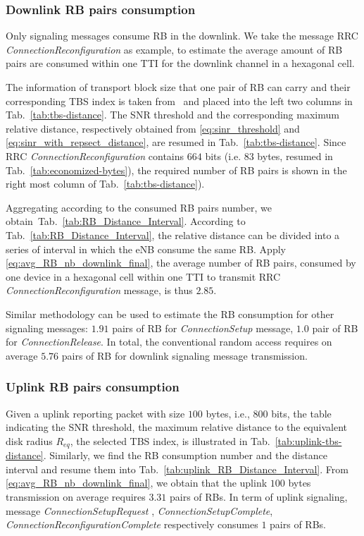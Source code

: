 
\subsubsection{Downlink RB pairs consumption}
Only signaling messages consume RB in the downlink. We take the message RRC \emph{ConnectionReconfiguration} as example, to estimate the average amount of RB pairs are consumed within one TTI for the downlink channel in a hexagonal cell. 

The information of transport block size that one pair of RB can carry and their corresponding TBS index is taken from~\cite[Tab.~7.1.7.2.1-1]{lte-eutra-physical-layer} and placed into the left two columns in Tab.~\ref{tab:tbs-distance}. The SNR threshold and the corresponding maximum relative distance, respectively obtained from \eqref{eq:sinr_threshold} and \eqref{eq:sinr_with_repsect_distance}, are resumed in Tab.~\ref{tab:tbs-distance}. Since RRC \emph{ConnectionReconfiguration} contains $664$ bits (i.e. $83$ bytes, resumed in Tab.~\ref{tab:economized-bytes}), the required number of RB pairs is shown in the right most column of Tab.~\ref{tab:tbs-distance}).



Aggregating according to the consumed RB pairs number, we obtain~Tab.~\ref{tab:RB_Distance_Interval}. According to Tab.~\ref{tab:RB_Distance_Interval}, the relative distance can be divided into a series of interval in which the eNB consume the same RB. Apply \eqref{eq:avg_RB_nb_downlink_final}, the average number of RB pairs, consumed by one device in a hexagonal cell within one TTI to transmit RRC \emph{ConnectionReconfiguration} message, is thus $2.85$.



Similar methodology can be used to estimate the RB consumption for other signaling messages: $1.91$ pairs of RB for \emph{ConnectionSetup} message, $1.0$ pair of RB for \emph{ConnectionRelease}. In total, the conventional random access requires on average $5.76$ pairs of RB for downlink signaling message transmission. 

\subsubsection{Uplink RB pairs consumption}
Given a uplink reporting packet with size $100$ bytes, i.e., $800$ bits, the table indicating the SNR threshold, the maximum relative distance to the equivalent disk radius $R_{eq}$, the selected TBS index, is illustrated in Tab.~\ref{tab:uplink-tbs-distance}. Similarly, we find the RB consumption number and the distance interval and resume them into Tab.~\ref{tab:uplink_RB_Distance_Interval}. From \eqref{eq:avg_RB_nb_downlink_final}, we obtain that the uplink $100$ bytes transmission on average requires $3.31$ pairs of RBs. In term of uplink signaling, message \emph{ConnectionSetupRequest} , \emph{ConnectionSetupComplete}, \emph{ConnectionReconfigurationComplete} respectively consumes $1$ pairs of RBs.

